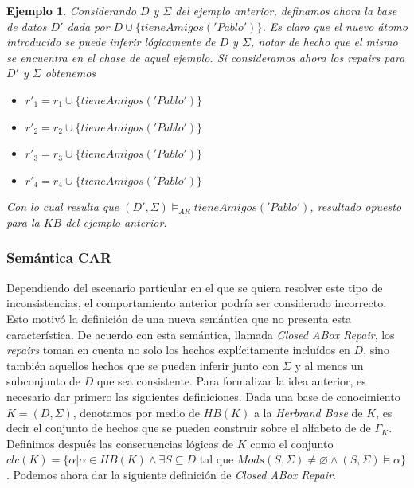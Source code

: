 \documentclass[11pt,a4paper,twoside]{tesis}
\newtheorem{exmp}{Ejemplo}
\begin{document}
\begin{exmp}\label{ejemplo_ar_2}
Considerando $D$ y $\Sigma$ del ejemplo anterior, definamos ahora la base de datos $D\prime$ dada por $D \cup \{tieneAmigos('Pablo')\}$. Es claro que el nuevo átomo introducido se puede inferir lógicamente de $D$ y $\Sigma$, notar de hecho que el mismo se encuentra en el chase de aquel ejemplo. Si consideramos ahora los \textit{repairs} para $D\prime$ y $\Sigma$ obtenemos
    \begin{itemize}
        \item $r\prime_1 = r_1 \cup \{tieneAmigos('Pablo')\}$
        \item $r\prime_2 = r_2 \cup \{tieneAmigos('Pablo')\}$
        \item $r\prime_3 = r_3 \cup \{tieneAmigos('Pablo')\}$
        \item $r\prime_4 = r_4 \cup \{tieneAmigos('Pablo')\}$
    \end{itemize}

Con lo cual resulta que $(D\prime, \Sigma)\models_{AR} tieneAmigos('Pablo')$, resultado opuesto para la $KB$ del ejemplo anterior.
\end{exmp}

\subsubsection{Semántica CAR}
Dependiendo del escenario particular en el que se quiera resolver este tipo de inconsistencias, el comportamiento anterior podría ser considerado incorrecto. Esto motivó la definición de una nueva semántica que no presenta esta característica. De acuerdo con esta semántica, llamada \textit{Closed ABox Repair}, los \textit{repairs} toman en cuenta no solo los hechos explícitamente incluídos en $D$, sino también aquellos hechos que se pueden inferir junto con $\Sigma$ y al menos un subconjunto de $D$ que sea consistente.
Para formalizar la idea anterior, es necesario dar primero las siguientes definiciones. Dada una base de conocimiento $K = (D, \Sigma)$, denotamos por medio de $HB(K)$ a la \textit{Herbrand Base} de $K$, es decir el conjunto de hechos que se pueden construir sobre el alfabeto de de $\Gamma_K$. Definimos después las consecuencias lógicas de $K$ como el conjunto $clc(K) = \{\alpha | \alpha \in HB(K) \land \exists S \subseteq D$ tal que $Mods(S, \Sigma) \neq  \varnothing \land (S, \Sigma) \models \alpha \}$. Podemos ahora dar la siguiente definición de \textit{Closed ABox Repair}.
\end{document}
